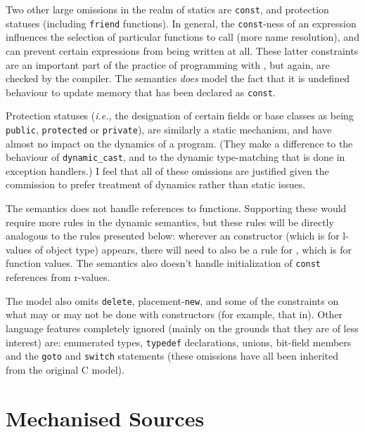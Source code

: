 \documentclass[11pt]{article}
\newcommand{\ie}{\emph{i.e.}}
\begin{document}
Two other large omissions in the realm of statics are \texttt{const},
and protection statuses (including \texttt{friend} functions).  In
general, the \texttt{const}-ness of an expression influences the
selection of particular functions to call (more name resolution), and
can prevent certain expressions from being written at all.  These
latter constraints are an important part of the practice of
programming with \cpp{}, but again, are checked by the compiler.  The
semantics \emph{does} model the fact that it is undefined behaviour to
update memory that has been declared as \texttt{const}.

Protection statuses (\ie, the designation of certain fields or base
classes as being \texttt{public}, \texttt{protected} or
\texttt{private}), are similarly a static mechanism, and have almost
no impact on the dynamics of a program.  (They make a difference to
the behaviour of \texttt{dynamic_cast}, and to the dynamic
type-matching that is done in exception handlers.)  I feel that all of
these omissions are justified given the commission to prefer treatment
of dynamics rather than static issues.

The semantics does not handle references to functions.  Supporting
these would require more rules in the dynamic semantics, but these
rules will be directly analogous to the rules presented below:
wherever an \clvalue{} constructor (which is for l-values of object
type) appears, there will need to also be a rule for \cfvalue{}, which
is for function values. The semantics also doesn't handle
initialization of \texttt{const} references from r-values.

The model also omits \texttt{delete}, placement-\texttt{new}, and some
of the constraints on what may or may not be done with constructors
(for example, that in\cite[\S12.1,~para~15]{cpp-standard-iso14882}).
Other language features completely ignored (mainly on the grounds that
they are of less interest) are: enumerated types, \texttt{typedef}
declarations, unions, bit-field members and the \texttt{goto} and
\texttt{switch} statements (these omissions have all been inherited
from the original C model).

\appendix
\section{Mechanised Sources}
\label{sec:sources}
\end{document}
